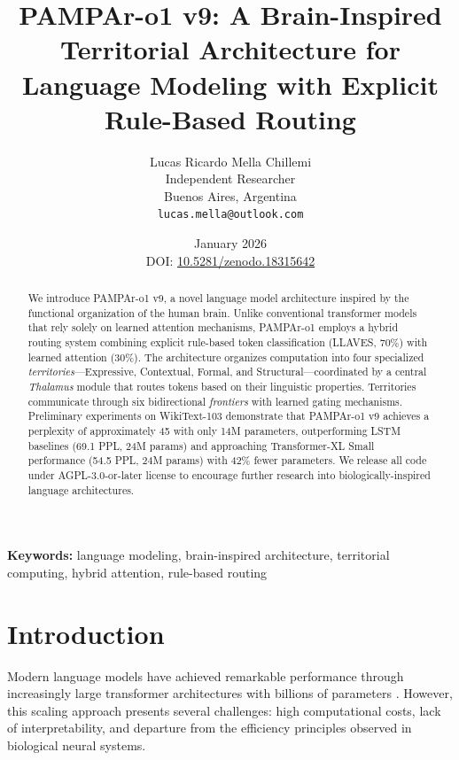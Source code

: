 \documentclass[11pt,a4paper]{article}
\title{PAMPAr-o1 v9: A Brain-Inspired Territorial Architecture for\\
Language Modeling with Explicit Rule-Based Routing}
\author{
Lucas Ricardo Mella Chillemi\\
Independent Researcher\\
Buenos Aires, Argentina\\
\texttt{lucas.mella@outlook.com}
}
\date{January 2026\\[1em]
\small DOI: \href{https://doi.org/10.5281/zenodo.18315642}{10.5281/zenodo.18315642}
}
\begin{document}
\maketitle

\begin{abstract}
We introduce PAMPAr-o1 v9, a novel language model architecture inspired by the functional organization of the human brain. Unlike conventional transformer models that rely solely on learned attention mechanisms, PAMPAr-o1 employs a hybrid routing system combining explicit rule-based token classification (LLAVES, 70\%) with learned attention (30\%). The architecture organizes computation into four specialized \textit{territories}---Expressive, Contextual, Formal, and Structural---coordinated by a central \textit{Thalamus} module that routes tokens based on their linguistic properties. Territories communicate through six bidirectional \textit{frontiers} with learned gating mechanisms. Preliminary experiments on WikiText-103 demonstrate that PAMPAr-o1 v9 achieves a perplexity of approximately 45 with only 14M parameters, outperforming LSTM baselines (69.1 PPL, 24M params) and approaching Transformer-XL Small performance (54.5 PPL, 24M params) with 42\% fewer parameters. We release all code under AGPL-3.0-or-later license to encourage further research into biologically-inspired language architectures.
\end{abstract}

\textbf{Keywords:} language modeling, brain-inspired architecture, territorial computing, hybrid attention, rule-based routing

\section{Introduction}
\label{sec:introduction}

Modern language models have achieved remarkable performance through increasingly large transformer architectures with billions of parameters \citep{brown2020language,touvron2023llama}. However, this scaling approach presents several challenges: high computational costs, lack of interpretability, and departure from the efficiency principles observed in biological neural systems.
\end{document}
